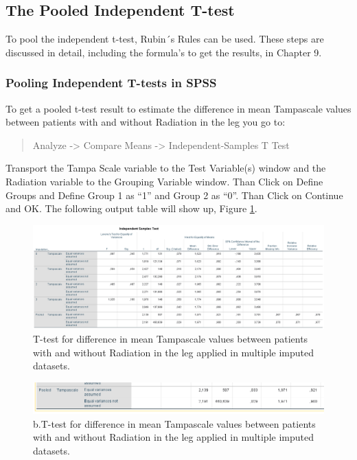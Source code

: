 \documentclass[]{book}
\theoremstyle{definition}
\theoremstyle{definition}
\theoremstyle{definition}
\theoremstyle{remark}
\begin{document}
\subsection{The Pooled Independent
T-test}\label{the-pooled-independent-t-test}

To pool the independent t-test, Rubin´s Rules can be used. These steps
are discussed in detail, including the formula's to get the results, in
Chapter 9.

\subsubsection{Pooling Independent T-tests in
SPSS}\label{pooling-independent-t-tests-in-spss}

To get a pooled t-test result to estimate the difference in mean
Tampascale values between patients with and without Radiation in the leg
you go to:

\begin{quote}
Analyze -\textgreater{} Compare Means -\textgreater{}
Independent-Samples T Test
\end{quote}

Transport the Tampa Scale variable to the Test Variable(s) window and
the Radiation variable to the Grouping Variable window. Than Click on
Define Groups and Define Group 1 as ``1'' and Group 2 as ``0''. Than
Click on Continue and OK. The following output table will show up,
Figure \ref{fig:tab5-1a}.

\begin{figure}

{\centering \includegraphics[width=0.9\linewidth]{images/table5.1} 

}

\caption{T-test for difference in mean Tampascale values between patients with and without Radiation in the leg applied in multiple imputed datasets.}\label{fig:tab5-1a}
\end{figure}

\begin{figure}

{\centering \includegraphics[width=0.9\linewidth]{images/table5.1b} 

}

\caption{b.T-test for difference in mean Tampascale values between patients with and without Radiation in the leg applied in multiple imputed datasets.}\label{fig:tab5-1b}
\end{figure}
\end{document}
